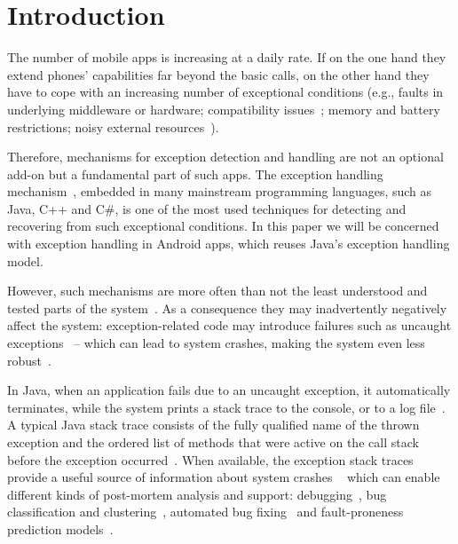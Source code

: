 \section{Introduction}
\label{intro}

The number of mobile apps is increasing at a daily rate. If on the one hand they
extend phones' capabilities far beyond the basic calls, on the other hand they have to
cope with an increasing number of exceptional conditions
(e.g., faults in underlying middleware or hardware; compatibility issues~\cite{McDon13};
memory and battery restrictions; noisy external resources~\cite{Zhang12}).

Therefore, mechanisms for exception detection and handling are not an optional add-on but a
fundamental part of such apps. The exception handling mechanism~\cite{goodenough1975exception},
embedded in many mainstream programming languages, such as Java, C++ and C\#,
 is one of the most used techniques for detecting and recovering from such exceptional conditions.
In this paper we will be concerned with exception handling in Android apps,
which reuses Java's exception handling model.


However, such mechanisms are more often than not the least
understood and tested parts of the system~\cite{miller1997issues,Robil00,shah2010understanding,
garcia2007extracting,garcia2001comparative,cabral2007exception,coelho2011unveiling,yuan:2014.osdi}.
As a consequence they may inadvertently negatively affect the system: exception-related code may introduce failures such as
uncaught exceptions~\cite{jo2004uncaught, Zhang12} --
which can lead to system crashes, making the system even less robust~\cite{coelho2011unveiling}.

In Java, when an application fails due to an uncaught exception,
it automatically terminates, while the system prints a stack trace to the console,
or to a log file~\cite{gosling2000java}.  A typical Java stack trace consists of  the fully qualified name
of the thrown exception and the ordered list of methods that were active on the call stack before
the exception occurred~\cite{gosling2000java,bloch2008effective}.
When available, the exception stack traces provide a useful source of information about system crashes ~\cite{bettenburg2008makes} which
can enable different kinds of post-mortem analysis and support:  debugging~\cite{schroter2010stack},
bug classification and clustering~\cite{wang2013improving, kim2011crash, dhaliwal2011classifying},
automated bug fixing~\cite{sinha2009fault} and fault-proneness prediction models~\cite{kim2013predicting}.

